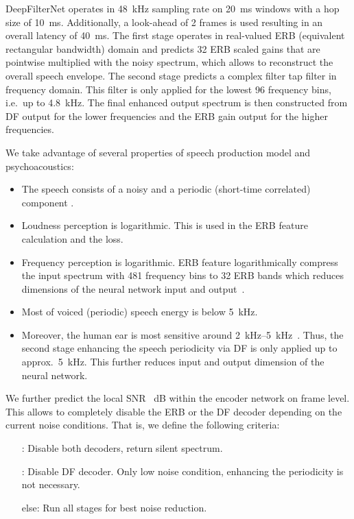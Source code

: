 \documentclass{INTERSPEECH2023}
\begin{document}
DeepFilterNet operates in \SI{48}{kHz} sampling rate on \SI{20}{\ms} windows with a hop size of \SI{10}{\ms}.
Additionally, a look-ahead of 2 frames is used resulting in an overall latency of \SI{40}{\ms}.
The first stage operates in real-valued ERB (equivalent rectangular bandwidth) domain and predicts 32 ERB scaled gains that are pointwise multiplied with the noisy spectrum, which allows to reconstruct the overall speech envelope.
The second stage predicts a complex filter  tap filter in frequency domain.
This filter is only applied for the lowest 96 frequency bins, i.e.~up to \SI{4.8}{\kHz}.
The final enhanced output spectrum is then constructed from DF output for the lower frequencies and the ERB gain output for the higher frequencies.

We take advantage of several properties of speech production model and psychoacoustics:
\begin{itemize}
  \item The speech consists of a noisy and a periodic (short-time correlated) component \cite{quatieri2002discrete}.
  \item Loudness perception is logarithmic.
    This is used in the ERB feature calculation and the loss.
      \item Frequency perception is logarithmic.
    ERB feature logarithmically compress the input spectrum with 481 frequency bins to 32 ERB bands which reduces dimensions of the neural network input and output~\cite{moore1988comparison}.
  \item Most of voiced (periodic) speech energy is below \SI{5}{\kHz}.
  \item Moreover, the human ear is most sensitive around \SIrange{2}{5}{\kHz}~\cite{suzuki2004equal}.
    Thus, the second stage enhancing the speech periodicity via DF is only applied up to approx.~\SI{5}{\kHz}.
    This further reduces input and output dimension of the neural network.
\end{itemize}

We further predict the local SNR ~\si{\dB} within the encoder network on frame level.
This allows to completely disable the ERB or the DF decoder depending on the current noise conditions.
That is, we define the following criteria:
\begin{enumerate}[leftmargin=2cm]
  \item[:] Disable both decoders, return silent spectrum.
  \item[:] Disable DF decoder. Only low noise condition, enhancing the periodicity is not necessary.
  \item[else:] Run all stages for best noise reduction.
\end{enumerate}
\end{document}
